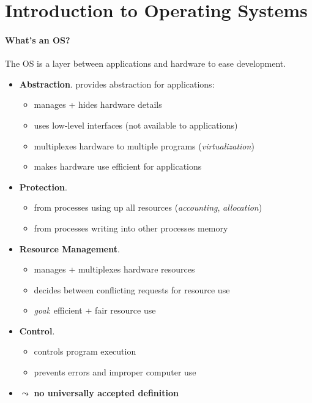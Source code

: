 \section{Introduction to Operating Systems}

\paragraph{What's an OS?}
The OS is a layer between applications and hardware to ease development.
\begin{itemize}
	\item \textbf{Abstraction}. provides abstraction for applications:
		\begin{itemize}
			\item manages + hides hardware details
			\item uses low-level interfaces (not available to applications)
			\item multiplexes hardware to multiple programs (\emph{virtualization})
			\item makes hardware use efficient for applications
		\end{itemize}
	\item \textbf{Protection}.
		\begin{itemize}
			\item from processes using up all resources (\emph{accounting}, \emph{allocation})
			\item from processes writing into other processes memory
		\end{itemize}
	\item \textbf{Resource Management}.
		\begin{itemize}
			\item manages + multiplexes hardware resources
			\item decides between conflicting requests for resource use
			\item \emph{goal}: efficient + fair resource use
		\end{itemize}
	\item \textbf{Control}.
		\begin{itemize}
			\item controls program execution
			\item prevents errors and improper computer use
		\end{itemize}
	\item $ \leadsto $ \textbf{no universally accepted definition}
\end{itemize}

